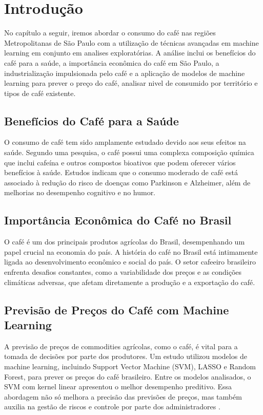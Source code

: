 \chapter{Introdução}
\label{ch:introducao}
\begin{resumocapitulo}
	No capítulo a seguir, iremos abordar o consumo do café nas regiões Metropolitanas de São Paulo com a utilização de técnicas  avançadas em machine learning em conjunto em analises exploratórias. A análise inclui os benefícios do café para a saúde, a importância econômica do café em São Paulo, a industrialização impulsionada pelo café e a aplicação de modelos de machine learning para prever o preço do café, analisar nivel de  consumido por território e tipos de café existente.  
\end{resumocapitulo}

\section{Benefícios do Café para a Saúde } 
\label{sec:Benefícios do Café para a Saúde}O consumo de café tem sido
amplamente estudado devido aos seus efeitos na saúde. Segundo uma pesquisa, o café possui uma complexa composição química que inclui cafeína e outros compostos bioativos que podem oferecer vários benefícios à saúde. Estudos indicam que o consumo moderado de café está associado à redução do risco de doenças como Parkinson e Alzheimer, além de melhorias no desempenho cognitivo e no humor. \cite{alves2009beneficios}

\section{Importância Econômica do Café no Brasil }
\label{sec:Importância Econômica do Café no Brasil}
O café é um dos principais produtos agrícolas do Brasil, desempenhando um papel crucial na economia do país. A história do café no Brasil está intimamente ligada ao desenvolvimento econômico e social do país. O setor cafeeiro brasileiro enfrenta desafios constantes, como a variabilidade dos preços e as condições climáticas adversas, que afetam diretamente a produção e a exportação do café. \cite{lopes2018prediccao}

\section{Previsão de Preços do Café com Machine Learning }
\label{sec:Previsão de Preços do Café com Machine Learning}
A previsão de preços de commodities agrícolas, como o café, é vital para a tomada de decisões por parte dos produtores. Um estudo utilizou modelos de machine learning, incluindo Support Vector Machine (SVM), LASSO e Random Forest, para prever os preços do café brasileiro. Entre os modelos analisados, o SVM com kernel linear apresentou o melhor desempenho preditivo. Essa abordagem não só melhora a precisão das previsões de preços, mas também auxilia na gestão de riscos e controle por parte dos administradores \cite{lopes2018prediccao}.

